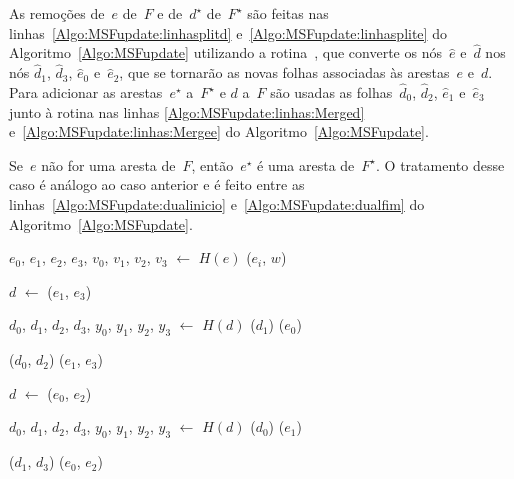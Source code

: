 As remoções de~$e$ de~$F$ e de~$d^\star$ de~$F^\star$ são feitas nas linhas~\ref{Algo:MSFupdate:linhasplitd} e~\ref{Algo:MSFupdate:linhasplite} do Algoritmo~\ref{Algo:MSFupdate} utilizando a rotina~\LCOSplit{}, que converte os nós~$\hat e$ e~$\hat d$ nos nós $\hat d_1$, $\hat d_3$, $\hat e_0$ e~$\hat e_2$, que se tornarão as novas folhas associadas às arestas~$e$ e~$d$.
Para adicionar as arestas~$e^\star$ a~$F^\star$ e $d$ a~$F$ são usadas as folhas~$\hat d_0$, $\hat d_2$, $\hat e_1$ e~$\hat e_3$ junto à rotina \LCOMerge{} nas linhas \ref{Algo:MSFupdate:linhas:Merged} e~\ref{Algo:MSFupdate:linhas:Mergee} do Algoritmo~\ref{Algo:MSFupdate}.

Se~$e$ não for uma aresta de~$F$, então~$e^\star$ é uma aresta de~$F^\star$.
O tratamento desse caso é análogo ao caso anterior e é feito entre as linhas~\ref{Algo:MSFupdate:dualinicio} e~\ref{Algo:MSFupdate:dualfim} do Algoritmo~\ref{Algo:MSFupdate}.

\begin{algorithm}[htb]
\caption{\MSFupdate($G$, $e$, $w$)}
\label{Algo:MSFupdate}
\begin{algorithmic}[1]
\State $e_0$, $e_1$, $e_2$, $e_3$, $v_0$, $v_1$, $v_2$, $v_3$ $\gets$ $H(e)$
\State  \LCOAddCost($e_i$, $w$)
\EndFor

\State $d$ $\gets$ \LCOMin($e_1$, $e_3$)\label{Algo:MSFupdate:linhamin}

\State $d_0$, $d_1$, $d_2$, $d_3$, $y_0$, $y_1$, $y_2$, $y_3$ $\gets$ $H(d)$
\State \LCOSplit($d_1$)\label{Algo:MSFupdate:linhasplitd}
\State \LCOSplit($e_0$)\label{Algo:MSFupdate:linhasplite}


\State \LCOMerge($d_0$, $d_2$)\label{Algo:MSFupdate:linhas:Merged}
\State \LCOMerge($e_1$, $e_3$)\label{Algo:MSFupdate:linhas:Mergee}

\EndIf

\Else{}
\State $d$ $\gets$ \LCOMax($e_0$, $e_2$)\label{Algo:MSFupdate:dualinicio}

\State $d_0$, $d_1$, $d_2$, $d_3$, $y_0$, $y_1$, $y_2$, $y_3$ $\gets$ $H(d)$
\State \LCOSplit($d_0$)
\State \LCOSplit($e_1$)

\State \LCOMerge($d_1$, $d_3$)
\State \LCOMerge($e_0$, $e_2$)

\EndIf
\EndIf\label{Algo:MSFupdate:dualfim}
\end{algorithmic}
\end{algorithm}


